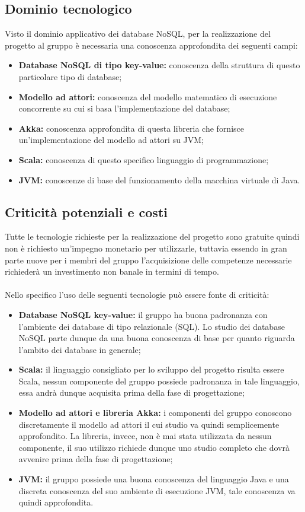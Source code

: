 \documentclass[a4paper]{article}
\begin{document}
		\subsection{Dominio tecnologico}
			Visto il dominio applicativo dei database NoSQL, per la realizzazione del progetto al gruppo è
			necessaria una conoscenza approfondita dei seguenti campi:
			\begin{itemize}
				\item \textbf{Database NoSQL di tipo key-value:} conoscenza della struttura di questo 
				particolare tipo di database;
				\item \textbf{Modello ad attori:} conoscenza del modello matematico di 
				esecuzione concorrente su cui si basa l'implementazione del database;
				\item \textbf{Akka:} conoscenza approfondita di questa libreria che fornisce 
				 un'implementazione del modello ad attori su JVM;
				\item \textbf{Scala:} conoscenza di questo specifico linguaggio di programmazione;
				\item \textbf{JVM:} conoscenze di base del funzionamento della macchina virtuale di Java.
			\end{itemize}
		\subsection{Criticità potenziali e costi}
			Tutte le tecnologie richieste per la realizzazione del progetto sono gratuite quindi non è richiesto
			un'impegno monetario per utilizzarle, tuttavia essendo in gran parte nuove per i membri del gruppo 
			l'acquisizione delle competenze necessarie richiederà un investimento non banale in termini di
			 tempo.
			\\ \\
			Nello specifico l'uso delle seguenti tecnologie può essere fonte di criticità:
			\begin{itemize}
				\item \textbf{Database NoSQL key-value:} il gruppo ha buona padronanza con l'ambiente dei 
				database di tipo relazionale (SQL). Lo studio dei database NoSQL parte dunque 
				da una buona conoscenza di base per quanto riguarda l'ambito dei database in generale;
				\item \textbf{Scala:} il linguaggio consigliato per lo sviluppo del progetto risulta essere Scala, 
				nessun componente del gruppo possiede padronanza in tale linguaggio, essa andrà dunque 
				acquisita prima della fase di progettazione;
				\item \textbf{Modello ad attori e libreria Akka:} i componenti del gruppo conoscono
				 discretamente il modello ad attori il cui studio va quindi semplicemente approfondito. La 
				 libreria, invece, non è mai stata utilizzata da nessun componente, il suo utilizzo richiede dunque
				 uno studio completo che dovrà avvenire prima della fase di progettazione;
				 \item \textbf{JVM:} il gruppo possiede una buona conoscenza del linguaggio Java e una 
				 discreta conoscenza del suo ambiente di esecuzione JVM, tale conoscenza va quindi
				  approfondita.
			\end{itemize}
\end{document}
